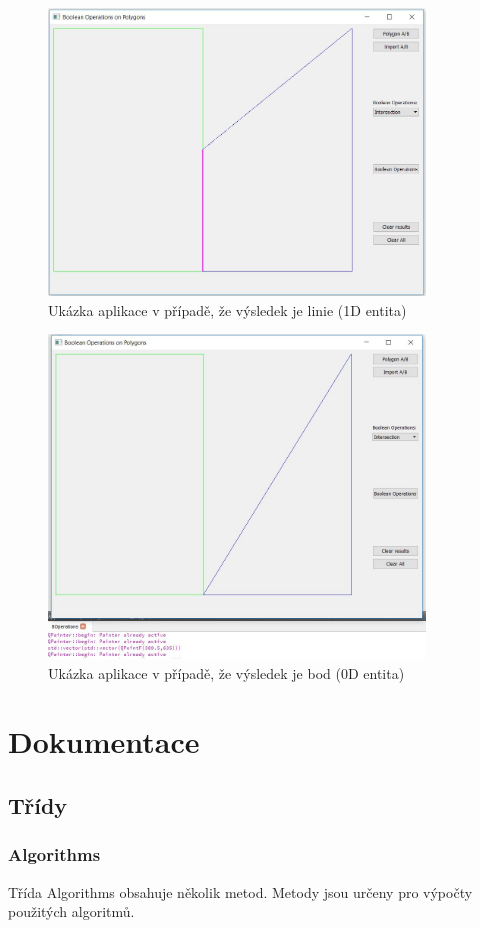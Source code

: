 \documentclass[a4paper, 12pt]{article}
\begin{document}
\begin{figure}[h!]
\centering
\includegraphics[width=10cm]{pictures/1D.jpg}
\caption{Ukázka aplikace v případě, že výsledek je linie (1D entita)}
\end{figure}

\begin{figure}[h!]
\centering
\includegraphics[width=10cm]{pictures/0D.jpg}
\caption{Ukázka aplikace v případě, že výsledek je bod (0D entita)}
\end{figure}

\clearpage



\section{Dokumentace}
\subsection{Třídy}
\subsubsection{Algorithms}
Třída Algorithms obsahuje několik metod. Metody jsou určeny pro výpočty použitých algoritmů.
\\
\end{document}
